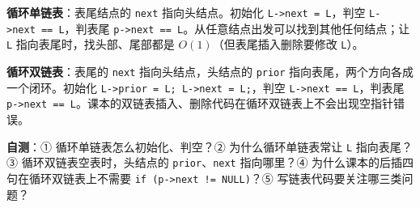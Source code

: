 \documentclass[10.5pt,a4paper,oneside]{article}
\begin{document}
\begin{summarybox}

\textbf{循环单链表}：表尾结点的 \texttt{next} 指向头结点。初始化
\texttt{L-\textgreater{}next\ =\ L}，判空
\texttt{L-\textgreater{}next\ ==\ L}，判表尾
\texttt{p-\textgreater{}next\ ==\ L}。从任意结点出发可以找到其他任何结点；让
\texttt{L} 指向表尾时，找头部、尾部都是 \(O(1)\)（但表尾插入删除要修改
\texttt{L}）。

\textbf{循环双链表}：表尾的 \texttt{next} 指向头结点，头结点的
\texttt{prior} 指向表尾，两个方向各成一个闭环。初始化
\texttt{L-\textgreater{}prior\ =\ L;\ L-\textgreater{}next\ =\ L;}，判空
\texttt{L-\textgreater{}next\ ==\ L}，判表尾
\texttt{p-\textgreater{}next\ ==\ L}。课本的双链表插入、删除代码在循环双链表上不会出现空指针错误。

\textbf{自测}：① 循环单链表怎么初始化、判空？② 为什么循环单链表常让
\texttt{L} 指向表尾？③ 循环双链表空表时，头结点的
\texttt{prior}、\texttt{next} 指向哪里？④
为什么课本的后插四句在循环双链表上不需要
\texttt{if\ (p-\textgreater{}next\ !=\ NULL)}？⑤
写链表代码要关注哪三类问题？

\end{summarybox}
\end{document}
